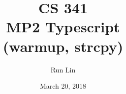 \documentclass[12pt, letterpaper]{article}
\title{CS 341\\ MP2 Typescript\\ (warmup, strcpy)}
\author{Run Lin}
\date{March 20, 2018}
\begin{document}
\begin{titlepage}
\maketitle
\thispagestyle{empty}
\end{titlepage}
\end{document}
